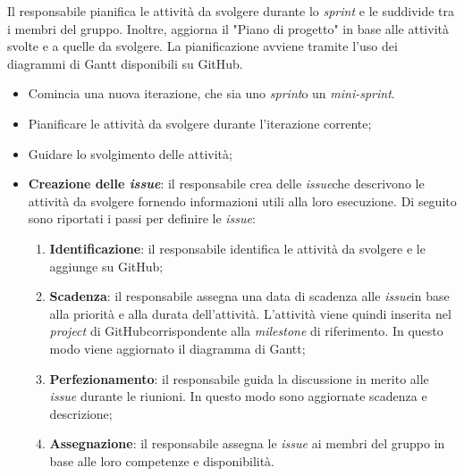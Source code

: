 \label{pianificazione-attivia}

Il responsabile pianifica le attività da svolgere durante lo \textit{sprint}
e le suddivide tra i membri del gruppo. Inoltre, aggiorna il "Piano di progetto"
in base alle attività svolte e a quelle da svolgere. La pianificazione avviene
tramite l'uso dei diagrammi di Gantt disponibili su GitHub\g.

\begin{itemize}
	\item Comincia una nuova iterazione, che sia uno \textit{sprint}\g o un
	      \textit{mini-sprint}\g.
\end{itemize}

\begin{itemize}
	\item Pianificare le attività da svolgere durante l'iterazione corrente;

	\item Guidare lo svolgimento delle attività;

\end{itemize}

\begin{itemize}
	\item \textbf{Creazione delle \textit{issue\g}}: il responsabile crea
	      delle \textit{issue}\g che descrivono le attività da svolgere fornendo informazioni utili alla loro esecuzione.
	      Di seguito sono riportati i passi per definire le \textit{issue\g}:
	      \begin{enumerate}
		      \item \textbf{Identificazione}: il responsabile identifica le
		            attività da svolgere e le aggiunge su GitHub\g;

		      \item \textbf{Scadenza}: il responsabile assegna una data di
		            scadenza alle \textit{issue}\g in base alla priorità e alla durata
		            dell'attività. L'attività viene quindi inserita nel
		            \textit{project} di GitHub\g corrispondente alla
		            \textit{milestone} di riferimento. In questo modo viene
		            aggiornato il diagramma di Gantt;

		      \item \textbf{Perfezionamento}: il responsabile guida la
		            discussione in merito alle \textit{issue\g} durante le
		            riunioni. In questo modo sono aggiornate scadenza e
		            descrizione;

		      \item \textbf{Assegnazione}: il responsabile assegna le \textit{issue}\g
		            ai membri del gruppo in base alle loro competenze e
		            disponibilità.
	      \end{enumerate}
\end{itemize}
